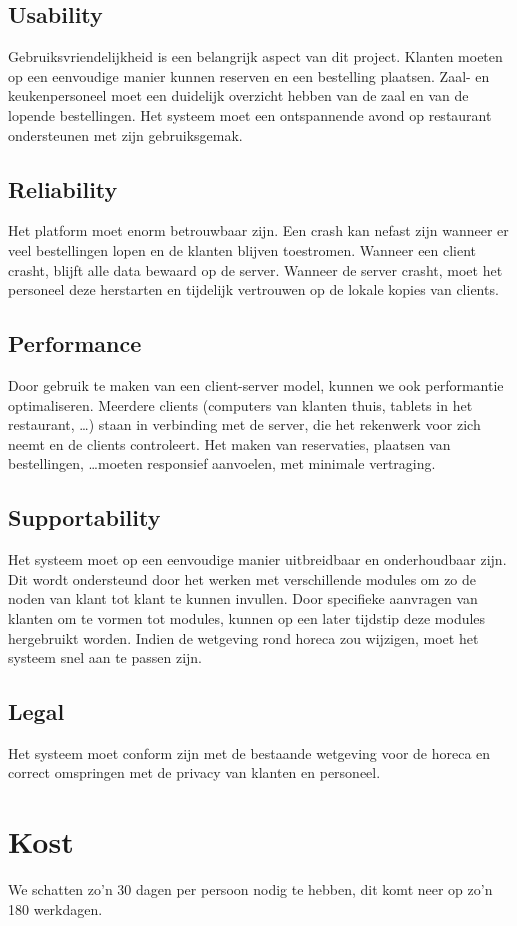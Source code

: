 \documentclass[a4paper]{article}
\begin{document}
\subsection{Usability}
Gebruiksvriendelijkheid is een belangrijk aspect van dit project. Klanten moeten op een eenvoudige manier kunnen reserven en een bestelling plaatsen. Zaal- en keukenpersoneel moet een duidelijk overzicht hebben van de zaal en van de lopende bestellingen. Het systeem moet een ontspannende avond op restaurant ondersteunen met zijn gebruiksgemak.
\subsection{Reliability}
Het platform moet enorm betrouwbaar zijn. Een crash kan nefast zijn wanneer er veel bestellingen lopen en de klanten blijven toestromen. Wanneer een client crasht, blijft alle data bewaard op de server. Wanneer de server crasht, moet het personeel deze herstarten en tijdelijk vertrouwen op de lokale kopies van clients. 
\subsection{Performance}
Door gebruik te maken van een client-server model, kunnen we ook performantie optimaliseren. Meerdere clients (computers van klanten thuis, tablets in het restaurant, \dots) staan in verbinding met de server, die het rekenwerk voor zich neemt en de clients controleert.
Het maken van reservaties, plaatsen van bestellingen, \dots moeten responsief aanvoelen, met minimale vertraging. 
\subsection{Supportability}
Het systeem moet op een eenvoudige manier uitbreidbaar en onderhoudbaar zijn. Dit wordt ondersteund door het werken met verschillende modules om zo de noden van klant tot klant te kunnen invullen. Door specifieke aanvragen van klanten om te vormen tot modules, kunnen op een later tijdstip deze modules hergebruikt worden. Indien de wetgeving rond horeca zou wijzigen, moet het systeem snel aan te passen zijn.
\subsection{Legal}
Het systeem moet conform zijn met de bestaande wetgeving voor de horeca en correct omspringen met de privacy van klanten en personeel.

\section{Kost}
We schatten zo'n 30 dagen per persoon nodig te hebben, dit komt neer op zo'n 180 werkdagen.
\end{document}
